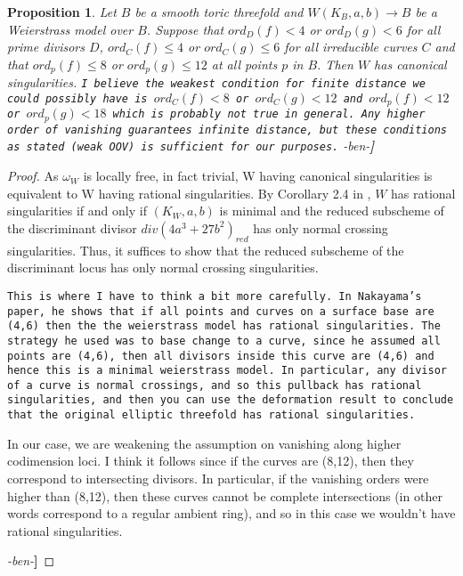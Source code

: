 \documentclass[aps,prl,twocolumn, superscriptaddress,groupedaddress,nofootinbib]{revtex4-1}
\newtheorem{prop}{Proposition}
\newcommand{\XXX}[3]{{\color{blue}{\bf [#1: } {\tt #3} {\it -#2-}{\bf ]}}}
\begin{document}
\begin{prop}
\label{prop:canonicalsing}
Let $B$ be a smooth toric threefold and $W(K_{B},a,b) \rightarrow B$ be a Weierstrass model over $B$. Suppose that $ord_{D}(f) < 4$ or $ord_{D}(g) < 6$ for all prime divisors $D$, $ord_{C}(f) \leq 4$ or $ord_{C}(g) \leq 6$ for all irreducible curves $C$ and that $ord_{p}(f) \leq 8$ or $ord_{p}(g) \leq 12$ at all points $p$ in $B$. Then $W$ has canonical singularities.  \XXX{all}{ben}{I believe the weakest condition for finite distance we could possibly have is $ord_{C}(f) < 8$ or $ord_{C}(g) < 12$ and $ord_{p}(f)<12$ or $ord_{p}(g)<18$ which is probably not true in general. Any higher order of vanishing guarantees infinite distance, but these conditions as stated (weak OOV) is sufficient for our purposes.}
\end{prop}
\begin{proof}
As $\omega_{W}$ is locally free, in fact trivial, W having canonical singularities is equivalent to W having rational singularities. By Corollary 2.4 in \cite{Nakayama}, $W$ has rational singularities if and only if $(K_{W},a,b)$ is minimal and the reduced subscheme of the discriminant divisor $div(4a^{3}+27b^{2})_{red}$ has only normal crossing singularities. Thus, it suffices to show that the reduced subscheme of the discriminant locus has only normal crossing singularities. \XXX{all}{ben}{This is where I have to think a bit more carefully. In Nakayama's paper, he shows that if all points and curves on a surface base are (4,6) then the the weierstrass model has rational singularities. The strategy he used was to base change to a curve, since he assumed all points are (4,6), then all divisors inside this curve are (4,6) and hence this is a minimal weierstrass model. In particular, any divisor of a curve is normal crossings, and so this pullback has rational singularities, and then you can use the deformation result to conclude that the original elliptic threefold has rational singularities.

In our case, we are weakening the assumption on vanishing along higher codimension loci. I think it follows since if the curves are (8,12), then they correspond to intersecting divisors. In particular, if the vanishing orders were higher than (8,12), then these curves cannot be complete intersections (in other words correspond to a regular ambient ring), and so in this case we wouldn't have rational singularities.}
 \end{proof}
\end{document}
